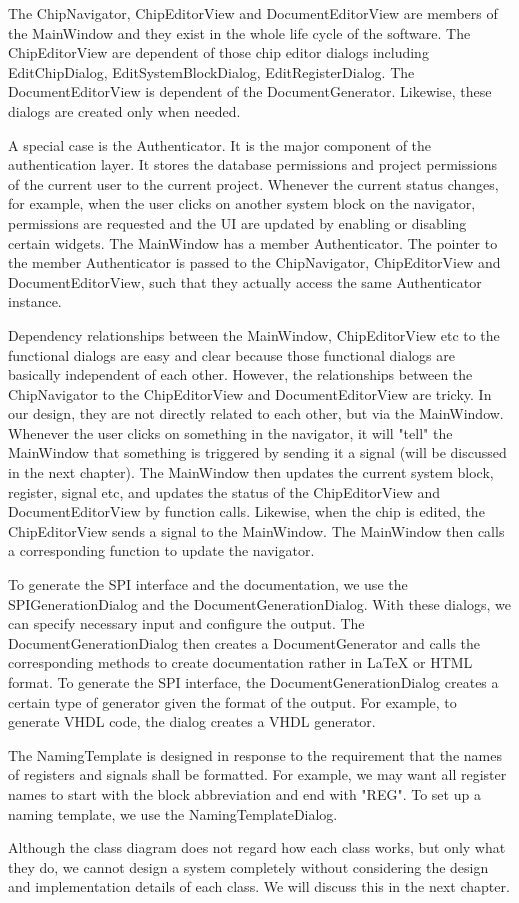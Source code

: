 The ChipNavigator, ChipEditorView and DocumentEditorView are members of the MainWindow and they exist in the whole life cycle of the software. The ChipEditorView are dependent of those chip editor dialogs including EditChipDialog, EditSystemBlockDialog, EditRegisterDialog. The DocumentEditorView is dependent of the DocumentGenerator. Likewise, these dialogs are created only when needed.

A special case is the Authenticator. It is the major component of the authentication layer. It stores the database permissions and project permissions of the current user to the current project. Whenever the current status changes, for example, when the user clicks on another system block on the navigator, permissions are requested and the UI are updated by enabling or disabling certain widgets. The MainWindow has a member Authenticator. The pointer to the member Authenticator is passed to the ChipNavigator, ChipEditorView and DocumentEditorView, such that they actually access the same Authenticator instance.

Dependency relationships between the MainWindow, ChipEditorView etc to the functional dialogs are easy and clear because those functional dialogs are basically independent of each other. However, the relationships between the ChipNavigator to the ChipEditorView and DocumentEditorView are tricky. In our design, they are not directly related to each other, but via the MainWindow. Whenever the user clicks on something in the navigator, it will "tell" the MainWindow that something is triggered by sending it a signal (will be discussed in the next chapter). The MainWindow then updates the current system block, register, signal etc, and updates the status of the ChipEditorView and DocumentEditorView by function calls. Likewise, when the chip is edited, the ChipEditorView sends a signal to the MainWindow. The MainWindow then calls a corresponding function to update the navigator.

To generate the SPI interface and the documentation, we use the SPIGenerationDialog and the DocumentGenerationDialog. With these dialogs, we can specify necessary input and configure the output. The DocumentGenerationDialog then creates a DocumentGenerator and calls the corresponding methods to create documentation rather in LaTeX or HTML format. To generate the SPI interface, the DocumentGenerationDialog creates a certain type of generator given the format of the output. For example, to generate VHDL code, the dialog creates a VHDL generator.

The NamingTemplate is designed in response to the requirement that the names of registers and signals shall be formatted. For example, we may want all register names to start with the block abbreviation and end with "REG". To set up a naming template, we use the NamingTemplateDialog.

Although the class diagram does not regard how each class works, but only what they do, we cannot design a system completely without considering the design and implementation details of each class. We will discuss this in the next chapter.